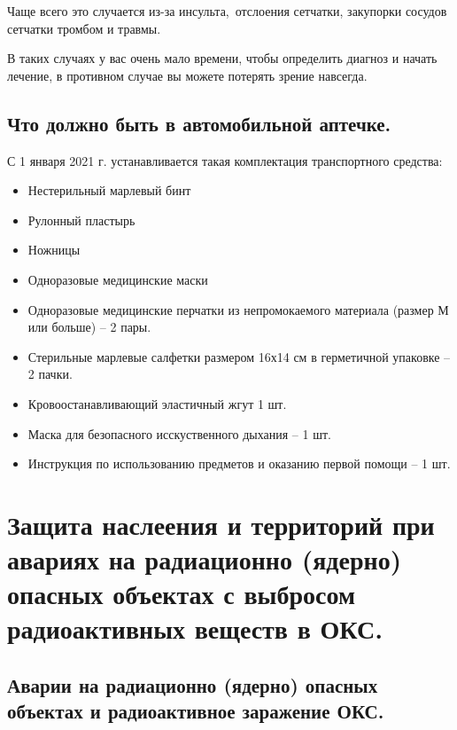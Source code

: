 \documentclass[a4paper, 12pt]{article}
\theoremstyle{definition}
\begin{document}
        Чаще всего это случается из-за инсульта, отслоения сетчатки, закупорки сосудов сетчатки тромбом и травмы. 

        В таких случаях у вас очень мало времени, чтобы определить диагноз и начать лечение, в противном случае вы можете потерять зрение навсегда.
        \subsection{Что должно быть в автомобильной аптечке.}
        С 1 января 2021 г. устанавливается такая комплектация транспортного средства:
        \begin{itemize}
            \item Нестерильный марлевый бинт
            \item Рулонный пластырь
            \item Ножницы
            \item Одноразовые медицинские маски
            \item Одноразовые медицинские перчатки из непромокаемого материала (размер М или больше) -- 2 пары.
            \item Стерильные марлевые салфетки размером 16х14 см в герметичной упаковке -- 2 пачки.
            \item Кровоостанавливающий эластичный жгут 1 шт.
            \item Маска для безопасного исскуственного дыхания -- 1 шт.
            \item Инструкция по использованию предметов и оказанию первой помощи -- 1 шт. 
        \end{itemize}

















        \section{Защита наслеения и территорий при авариях на радиационно (ядерно) опасных объектах с выбросом радиоактивных веществ в ОКС.}
        \subsection{Аварии на радиационно (ядерно) опасных объектах и радиоактивное заражение ОКС.}
\end{document}
